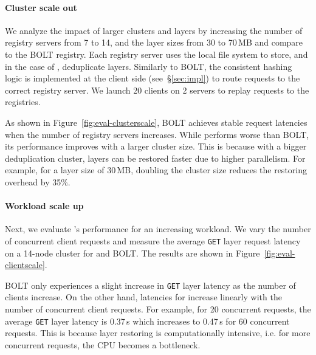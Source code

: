 
\paragraph{Cluster scale out}
%
We analyze the impact of larger clusters and layers by increasing the number of registry servers from
7 to 14, and the layer sizes from 30 to 70\,MB and compare \sysname to the BOLT registry.
%
Each registry server uses the local file system to store, and in the case of \sysname, deduplicate layers.
%
Similarly to BOLT, the consistent hashing logic is implemented at the client
side (see~\S\ref{sec:impl}) to route requests to the correct registry server.
We launch 20 clients on 2 servers to replay requests to the registries.

As shown in Figure~\ref{fig:eval-clusterscale}, BOLT achieves stable request latencies when
the number of registry servers increases.
%
While \sysname performs worse than BOLT, its performance improves with a larger cluster size.
%
This is because with a bigger deduplication cluster, layers can be restored faster due to higher
parallelism.
%
For example, for a layer size of 30\,MB, doubling the cluster size reduces the restoring
overhead by 35\%.

\paragraph{Workload scale up}
%
Next, we evaluate \sysname{}'s performance for an increasing workload.
%
We vary the number of concurrent client requests and measure the average \texttt{GET} layer
request latency on a 14-node cluster for \sysname and BOLT.
%
The results are shown in Figure~\ref{fig:eval-clientscale}.

BOLT only experiences a slight increase in \texttt{GET} layer latency as the number of clients increase.
%
On the other hand, latencies for \sysname increase linearly with the number of concurrent client requests.
%
For example, for 20 concurrent requests, the average \texttt{GET} layer latency is 0.37\,s which
increases to 0.47\,s for 60 concurrent requests.
%
This is because layer restoring is computationally intensive, i.e. for more concurrent requests, the CPU
becomes a bottleneck.

